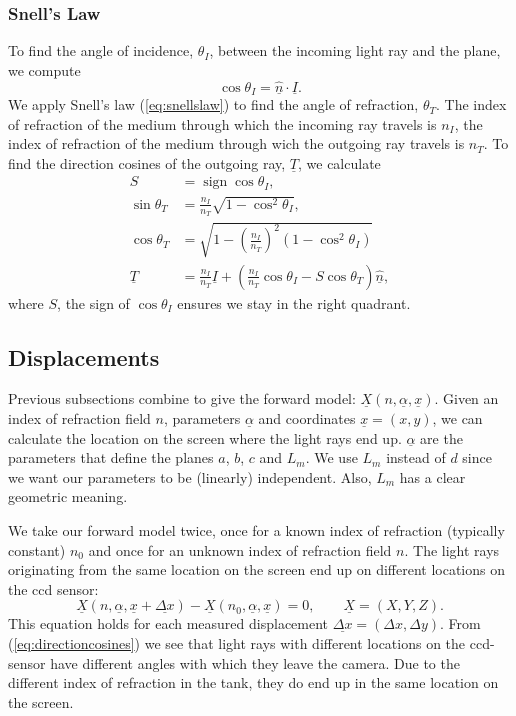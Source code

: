 \documentclass[smallextended]{svjour3}       %
\DeclareMathOperator{\sign}{sign}
\begin{document}
\subsubsection{Snell's Law}
To find the angle of incidence, $\theta_I$, between the incoming light ray and the plane, we compute
\begin{equation}
	\cos \theta_I = \underline{\hat{n}} \cdot \underline{I}.
\end{equation}
We apply Snell's law (\ref{eq:snellslaw}) to find the angle of refraction, $\theta_T$. The index of refraction of the medium through which the incoming ray travels is $n_I$, the index of refraction of the medium through wich the outgoing ray travels is $n_T$. To find the direction cosines of the outgoing ray, $\underline{T}$, we calculate 
\begin{align}
	S &= \sign \cos \theta_I, \\
	\sin \theta_T &= \frac{n_I}{n_T} \sqrt{1-\cos^2 \theta_I}, \\
	\cos \theta_T &= \sqrt{1-\left(\frac{n_I}{n_T}\right)^2(1-\cos^2 \theta_I)} \\
	\underline{T} &= \frac{n_I}{n_T} \underline{I} + \left(\frac{n_I}{n_T} \cos \theta_I - S \cos\theta_T\right)\underline{\hat{n}},	
\end{align}
where $S$, the sign of $\cos\theta_I$ ensures we stay in the right quadrant.

\subsection{Displacements}
Previous subsections combine to give the forward model: $\underline{X}(n,\underline{\alpha}, \underline{x})$. Given an index of refraction field $n$, parameters $\underline{\alpha}$ and coordinates $\underline{x} = (x,y)$, we can calculate the location on the screen where the light rays end up. $\underline{\alpha}$ are the parameters that define the planes $a$, $b$, $c$ and $L_m$. We use $L_m$ instead of $d$ since we want our parameters to be (linearly) independent. Also, $L_m$ has a clear geometric meaning.

We take our forward model twice, once for a known index of refraction (typically constant) $n_0$ and once for an unknown index of refraction field $n$. The light rays originating from the same location on the screen end up on different locations on the ccd sensor:
\begin{equation}
\label{eq:ForwardModel}
	 \underline{X}(n, \underline{\alpha}, \underline{x}+\underline{\Delta x}) - \underline{X}(n_0, \underline{\alpha}, \underline{x}) = 0, \qquad \underline{X} = (X, Y, Z).
\end{equation}
This equation holds for each measured displacement $\underline{\Delta x} = (\Delta x, \Delta y)$. From (\ref{eq:directioncosines}) we see that light rays with different locations on the ccd-sensor have different angles with which they leave the camera. Due to the different index of refraction in the tank, they do end up in the same location on the screen.
\end{document}
